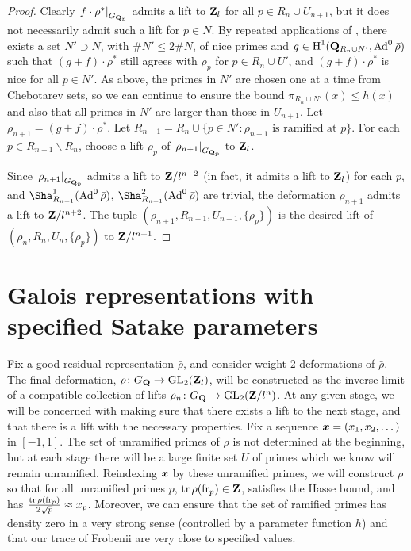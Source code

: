 \begin{proof}
Clearly $\left. f\cdot \rho^\ast\right|_{G_{\mathbf{Q}_p}}$ admits a lift to $\mathbf{Z}_l$ 
for all $p\in R_n\cup U_{n+1}$, but it does not necessarily admit such a lift for 
$p\in N$. By repeated applications of \cite[Prop.~3.10]{pande-2011}, there 
exists a set $N'\supset N$, with $\# N'\leqslant 2\# N$, of nice primes and 
$g\in \operatorname{H}^1(\mathbf{Q}_{R_n\cup N'},\operatorname{Ad}^0\bar\rho)$ such that 
$(g+f)\cdot \rho^\ast$ still agrees with $\rho_p$ for $p\in R_n\cup U'$, and 
$(g+f)\cdot \rho^\ast$ is nice for all $p\in N'$. As above, the primes in $N'$ 
are chosen one at a time from Chebotarev sets, so we can continue to ensure the 
bound $\pi_{R_n\cup N'}(x)\leqslant h(x)$ and also that all primes in $N'$ 
are larger than those in $U_{n+1}$. Let $\rho_{n+1} = (g+f) \cdot \rho^\ast$. Let 
$R_{n+1} = R_n\cup \{p\in N' : \rho_{n+1}\text{ is ramified at }p\}$. For each 
$p\in R_{n+1}\smallsetminus R_n$, choose a lift $\rho_p$ of 
$\left. \rho_{n+1}\right|_{G_{\mathbf{Q}_p}}$ to $\mathbf{Z}_l$. 

Since $\left.\rho_{n+1}\right|_{G_{\mathbf{Q}_p}}$ admits a lift to $\mathbf{Z}/l^{n+2}$ (in 
fact, it admits a lift to $\mathbf{Z}_l$) for each $p$, and 
$\Sha_{R_{n+1}}^1(\Ad^0\bar\rho)$, $\Sha_{R_{n+1}}^2(\Ad^0\bar\rho)$ are 
trivial, the deformation $\rho_{n+1}$ admits a lift to $\mathbf{Z}/l^{n+2}$. The tuple 
$(\rho_{n+1},R_{n+1},U_{n+1},\{\rho_p\})$ is the desired lift of 
$(\rho_n,R_n,U_n,\{\rho_p\})$ to $\mathbf{Z}/l^{n+1}$. 
\end{proof}





\section{Galois representations with specified Satake parameters}

Fix a good residual representation $\bar\rho$, and consider weight-$2$ 
deformations of $\bar\rho$. The final deformation, 
$\rho\colon G_{\mathbf{Q}} \to \operatorname{GL}_2(\mathbf{Z}_l)$, will be constructed as the inverse limit 
of a compatible collection of lifts $\rho_n\colon G_{\mathbf{Q}} \to \operatorname{GL}_2(\mathbf{Z}/l^n)$. At 
any given stage, we will be concerned with making sure that there exists a 
lift to the next stage, and that there is a lift with the necessary properties. 
Fix a sequence ${\boldsymbol x}=(x_1,x_2,\dots)$ in $[-1,1]$. The set of unramified primes 
of $\rho$ is not determined at the beginning, but at each stage there will be 
a large finite set $U$ of primes which we know will remain unramified. 
Reindexing ${\boldsymbol x}$ by these unramified primes, we will construct $\rho$ so that 
for all unramified primes $p$, $\operatorname{tr}\rho(\mathrm{fr}_p)\in \mathbf{Z}$, satisfies the Hasse 
bound, and has $\frac{\operatorname{tr}\rho(\mathrm{fr}_p)}{2\sqrt p} \approx x_p$. 
Moreover, we can ensure that the 
set of ramified primes has density zero in a very strong sense (controlled by a 
parameter function $h$) and that our trace of Frobenii are very close to 
specified values. 

